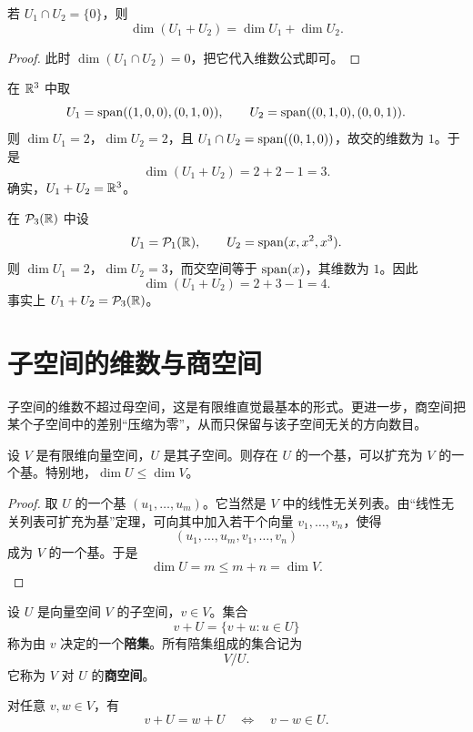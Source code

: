 \begin{corollary} 若 $U_1\cap U_2=\{0\}$，则
\[ \dim(U_1+U_2)=\dim U_1+\dim U_2. \]
\end{corollary}

\begin{proof} 此时 $\dim(U_1\cap U_2)=0$，把它代入维数公式即可。
\end{proof}

\begin{example} 在 $\mathbb{R}^3$ 中取
\[ U_1=\operatorname{span}((1,0,0),(0,1,0)), \qquad U_2=\operatorname{span}((0,1,0),(0,0,1)). \]
则 $\dim U_1=2$，$\dim U_2=2$，且 $U_1\cap U_2=\operatorname{span}((0,1,0))$，故交的维数为 $1$。于是
\[ \dim(U_1+U_2)=2+2-1=3. \]
确实，$U_1+U_2=\mathbb{R}^3$。
\end{example}

\begin{example} 在 $\mathcal{P}_3(\mathbb{R})$ 中设
\[ U_1=\mathcal{P}_1(\mathbb{R}), \qquad U_2=\operatorname{span}(x,x^2,x^3). \]
则 $\dim U_1=2$，$\dim U_2=3$，而交空间等于 $\operatorname{span}(x)$，其维数为 $1$。因此
\[ \dim(U_1+U_2)=2+3-1=4. \]
事实上 $U_1+U_2=\mathcal{P}_3(\mathbb{R})$。
\end{example}

\section{子空间的维数与商空间}

子空间的维数不超过母空间，这是有限维直觉最基本的形式。更进一步，商空间把某个子空间中的差别“压缩为零”，从而只保留与该子空间无关的方向数目。

\begin{theorem} 设 $V$ 是有限维向量空间，$U$ 是其子空间。则存在 $U$ 的一个基，可以扩充为 $V$ 的一个基。特别地，$\dim U\le \dim V$。
\end{theorem}

\begin{proof} 取 $U$ 的一个基 $(u_1,\dots,u_m)$。它当然是 $V$ 中的线性无关列表。由“线性无关列表可扩充为基”定理，可向其中加入若干个向量 $v_1,\dots,v_n$，使得
\[ (u_1,\dots,u_m,v_1,\dots,v_n) \]
成为 $V$ 的一个基。于是
\[ \dim U=m\le m+n=\dim V. \]
\end{proof}

\begin{definition} 设 $U$ 是向量空间 $V$ 的子空间，$v\in V$。集合
\[ v+U=\{v+u:u\in U\} \]
称为由 $v$ 决定的一个\textbf{陪集}。所有陪集组成的集合记为
\[ V/U. \]
它称为 $V$ 对 $U$ 的\textbf{商空间}。
\end{definition}

\begin{proposition} 对任意 $v,w\in V$，有
\[ v+U=w+U \quad\Longleftrightarrow\quad v-w\in U. \]
\end{proposition}

